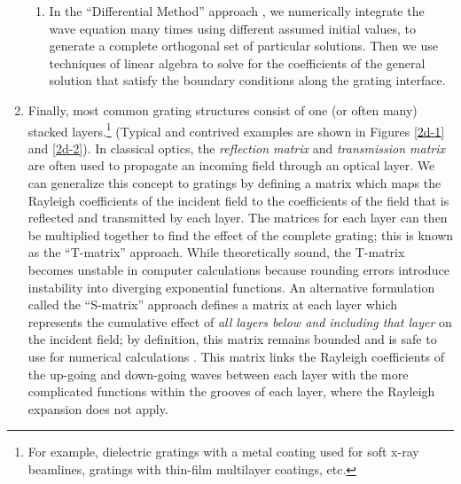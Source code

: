 \begin{enumerate}
\begin{enumerate}
	\item In the ``Differential Method'' approach \cite{Pop00}, we numerically integrate the wave equation many times using different assumed initial values, to generate a complete orthogonal set of particular solutions. Then we use techniques of linear algebra to solve for the coefficients of the general solution that satisfy the boundary conditions along the grating interface.
	\end{enumerate}
\item Finally, most common grating structures consist of one (or often many) stacked layers.\footnote{For example, dielectric gratings with a metal coating used for soft x-ray beamlines, gratings with thin-film multilayer coatings, etc.} (Typical and contrived examples are shown in Figures \ref{2d-1} and \ref{2d-2}).  In classical optics, the \emph{reflection matrix} and \emph{transmission matrix} are often used to propagate an incoming field through an optical layer.  We can generalize this concept to gratings by defining a matrix which maps the Rayleigh coefficients of the incident field to the coefficients of the field that is reflected and transmitted by each layer.  The matrices for each layer can then be multiplied together to find the effect of the complete grating; this is known as the ``T-matrix'' approach.  While theoretically sound, the T-matrix becomes unstable in computer calculations because rounding errors introduce instability into diverging exponential functions.  An alternative formulation called the ``S-matrix'' approach defines a matrix at each layer which represents the cumulative effect of \emph{all layers below and including that layer} on the incident field; by definition, this matrix remains bounded and is safe to use for numerical calculations \cite{Li96}.  This matrix links the Rayleigh coefficients of the up-going and down-going waves between each layer with the more complicated functions within the grooves of each layer, where the Rayleigh expansion does not apply. 
\end{enumerate}

